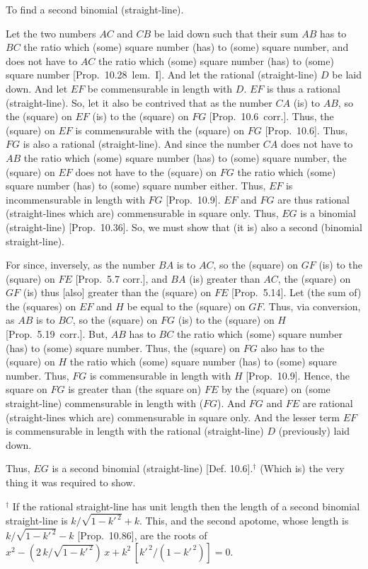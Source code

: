 \begin{Parallel}{}{}
{To find a second binomial (straight-line).

Let the two numbers $AC$ and $CB$ be laid down such that their sum $AB$
has to $BC$ the ratio which (some) square number (has) to (some)
square number, and does not have to $AC$ the ratio which (some)
square number (has) to (some) square number [Prop.~10.28~lem.~I]. And let the rational (straight-line) $D$ be laid down. And let $EF$ be commensurable in length with $D$.
$EF$ is thus a rational (straight-line).
So, let it also be contrived that as the number $CA$ (is) to $AB$,
so the (square) on $EF$ (is) to the (square) on $FG$ [Prop.~10.6~corr.]. Thus, the (square) on $EF$
is commensurable with the (square) on $FG$ [Prop.~10.6]. Thus, $FG$ is also a rational
(straight-line). And since the number $CA$ does not have to $AB$ the ratio
which (some) square number (has) to (some) square number, the
(square) on $EF$ does not have to the (square) on $FG$ the ratio
which (some) square number (has) to (some) square number either.
Thus, $EF$  is incommensurable in length with $FG$ [Prop.~10.9]. $EF$ and $FG$
are thus rational (straight-lines which are) commensurable in square only.
Thus, $EG$ is a binomial (straight-line) [Prop.~10.36]. So, we must show
that (it is) also a second (binomial straight-line).

\centerline{}

For since, inversely, as the number $BA$ is to $AC$, so the (square)
on $GF$ (is) to the (square) on $FE$ [Prop.~5.7 corr.],
and $BA$ (is) greater than $AC$, the (square) on $GF$ (is)
thus [also] greater than the (square) on $FE$ [Prop.~5.14]. Let (the sum of) the (squares) on $EF$ and $H$ be equal to the (square) on $GF$. Thus, via conversion, as 
$AB$ is to $BC$, so the (square) on $FG$ (is) to the (square) on $H$
[Prop.~5.19~corr.]. But, $AB$ has to $BC$ the
ratio which (some) square number (has) to (some) square number. Thus,
the (square) on $FG$ also has to the (square) on $H$ the ratio
which (some) square number (has) to (some) square number. Thus,
$FG$ is commensurable in length with $H$ [Prop.~10.9]. Hence, the square on $FG$ is
greater than (the square on) $FE$ by the (square) on (some straight-line)
commensurable in length with ($FG$). And $FG$ and $FE$ are rational (straight-lines which
are) commensurable in square only. And  the lesser term $EF$ is commensurable in length with the rational (straight-line) $D$ (previously)
laid down.

Thus, $EG$ is a second binomial (straight-line) [Def. 10.6].$^\dag$ (Which is) the very thing it
was required to show.}
\end{Parallel}
{\footnotesize\noindent $^\dag$ If the rational straight-line has unit length then the length of a second binomial straight-line
is  $k/\sqrt{1-k'^{\,2}}+k$. This, and the second apotome,
whose length is $k/\sqrt{1-k'^{\,2}}-k$ [Prop.~10.86],
are the roots of $x^2- (2\,k/\sqrt{1-k'^{\,2}})\,x+k^2\,[k'^{\,2}/(1-k'^{\,2})]=0$.}  

